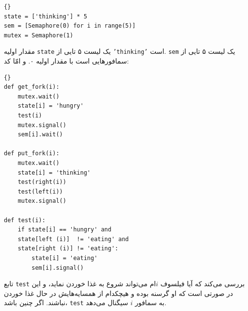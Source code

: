 \documentclass{book}
\begin{document}
\begin{latin}
\begin{latin}
\begin{lstlisting}[title={متغیرهای راه حل تننبام}]{}
state = ['thinking'] * 5
sem = [Semaphore(0) for i in range(5)]
mutex = Semaphore(1)
\end{lstlisting}
\end{latin}
\end{latin}

    مقدار اولیه {\tt state} یک لیست ۵ تایی از {\tt 'thinking'} است.     {\tt sem}
    یک لیست ۵ تایی از سمافورهایی است با مقدار اولیه ۰. 
    و امّا کد: 

\begin{latin}
\begin{latin}
\begin{lstlisting}[title={ راه حل تننبام}]{}
def get_fork(i):
    mutex.wait()
    state[i] = 'hungry'
    test(i)
    mutex.signal()
    sem[i].wait()

def put_fork(i):
    mutex.wait()
    state[i] = 'thinking'
    test(right(i))
    test(left(i))
    mutex.signal()

def test(i):
    if state[i] == 'hungry' and
    state[left (i)]  != 'eating' and
    state[right (i)] != 'eating':
        state[i] = 'eating'
        sem[i].signal()
\end{lstlisting}
\end{latin}
\end{latin}


    تابع {\tt test}  بررسی می‌کند که آیا فیلسوف $i$ام می‌تواند شروع به غذا خوردن نماید، و این در صورتی است که 
    او گرسنه بوده و هیچکدام از همسایه‌هایش در حال غذا خوردن نباشند. اگر چنین باشد، {\tt test} به سمافور $i$ سیگنال می‌دهد. 
    
\end{document}
